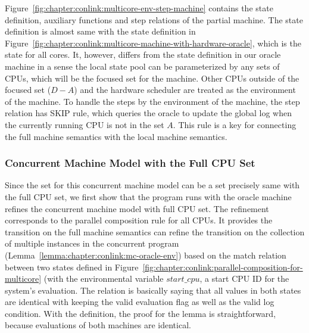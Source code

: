 Figure~\ref{fig:chapter:conlink:multicore-env-step-machine} contains the state definition, 
auxiliary functions and step relations of the partial machine. 
The state definition is almost same with the state definition in Figure~\ref{fig:chapter:conlink:multicore-machine-with-hardware-oracle},
which is the state for all cores.
It, however, differs from the state definition in our oracle machine in a sense the local state pool can be parameterized by any sets of CPUs, which will be the focused set for the machine.
Other CPUs outside of the focused set ($D - A$) and the hardware scheduler are treated as the environment of the machine. 
To handle the steps by the environment of the machine, the step relation has \textsf{SKIP} rule, 
which queries the oracle to update the global log when the currently running CPU is not in the set $A$.
This rule is a key for connecting the full machine semantics with the local machine semantics. 

\subsubsection{Concurrent Machine Model with the Full CPU Set}

Since the set for this concurrent machine model can be a set precisely same with the full CPU set, 
we first show that the program runs with the oracle machine refines the concurrent machine model with full CPU set. 
The refinement corresponds to the parallel composition rule for all CPUs. It provides the transition on the full machine semantics can refine the transition on the collection of multiple instances in the concurrent program (Lemma~\ref{lemma:chapter:conlink:mc-oracle-env}) based on the 
match relation between two states defined in Figure~\ref{fig:chapter:conlink:parallel-composition-for-multicore} (with the 
environmental variable $start\_cpu$, a start CPU ID for the system's evaluation. 
The relation is basically saying that all values in both states are identical with keeping the valid evaluation flag as well as the valid log condition. 
With the definition, the proof for the lemma is straightforward, because evaluations of both machines are identical. 


